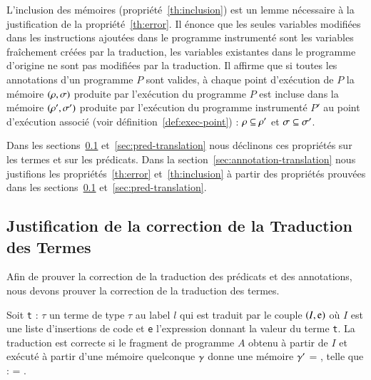 L'inclusion des mémoires (propriété~\ref{th:inclusion}) est un lemme
nécessaire à la justification de la propriété~\ref{th:error}.
Il énonce que les seules variables modifiées dans les instructions ajoutées dans
le programme instrumenté sont les variables fraîchement créées par la
traduction, les variables existantes dans le programme d'origine ne sont pas
modifiées par la traduction.
Il affirme que si toutes les annotations d'un programme $P$ sont valides, à
chaque point d'exécution de $P$ la mémoire $(\rho, \sigma)$ produite par
l'exécution du programme $P$ est incluse dans la mémoire $(\rho', \sigma')$
produite par l'exécution du programme instrumenté $P'$ au point d'exécution
associé (voir définition~\ref{def:exec-point}) :
$\rho \subseteq \rho'$ et $\sigma \subseteq \sigma'$.

Dans les sections~\ref{sec:term-translation} et~\ref{sec:pred-translation}
nous déclinons ces propriétés sur les termes et sur les prédicats.
Dans la section~\ref{sec:annotation-translation} nous justifions les
propriétés~\ref{th:error} et~\ref{th:inclusion} à partir des propriétés prouvées
dans les sections~\ref{sec:term-translation} et~\ref{sec:pred-translation}.


\subsection{Justification de la correction de la Traduction des Termes}
\label{sec:term-translation}

Afin de prouver la correction de la traduction des prédicats et des annotations,
nous devons prouver la correction de la traduction des termes.

\begin{myproperty}
  \label{lem:term-correct}
  Soit \lstinline't' : $\tau$ un terme de type $\tau$ au label $l$ qui est
  traduit par le couple $(I, \mbox{\lstinline'e'})$ où $I$ est une liste
  d'insertions de code et \lstinline'e' l'expression donnant la valeur du terme
  \lstinline't'.
  La traduction est correcte si le fragment de programme $A$ obtenu à partir de
  $I$ et exécuté à partir d'une mémoire quelconque $\gamma$ donne une
  mémoire $\gamma'$ = , telle que :
   = .
\end{myproperty}

